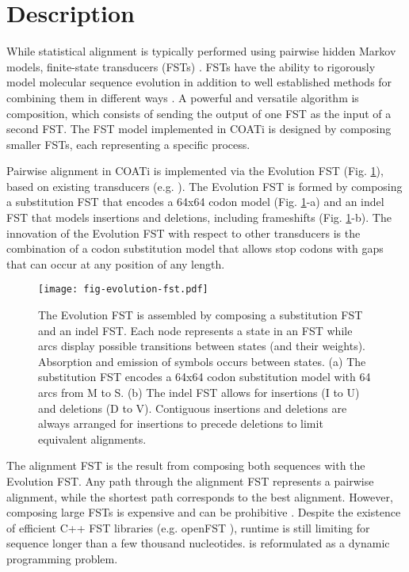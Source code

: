 \section{Description}

While statistical alignment is typically performed using pairwise hidden Markov
models, finite-state transducers (FSTs) .
FSTs  have the ability to rigorously model molecular sequence
evolution in addition to well established methods for combining them in
different ways \parencite{bradley2007transducers}.
A powerful and versatile algorithm is composition, which consists of sending the
output of one FST as the input of a second FST.
The FST model implemented in COATi is designed by composing smaller FSTs, each
representing a specific process.

Pairwise alignment in COATi is implemented via the Evolution FST (Fig.
\ref{fig:evolution-fst}), based on existing transducers (e.g.
\cite{holmes2001evolutionary}).
The Evolution FST is formed by composing a substitution FST that encodes a 64x64
codon model (Fig. \ref{fig:evolution-fst}-a) and an indel FST that models
insertions and deletions, including frameshifts (Fig. \ref{fig:evolution-fst}-b).
The innovation of the Evolution FST with respect to other transducers is the
combination of a codon substitution model that allows stop codons with gaps that
can occur at any position of any length.

\begin{figure}[h!]
\begin{framed}
\centering
    \texttt{[image: fig-evolution-fst.pdf]}
    \caption{The Evolution FST is assembled by composing a substitution FST and
    an indel FST. Each node represents a state in an FST while arcs display
    possible transitions between states (and their weights). Absorption and
    emission of symbols occurs between states. (a) The substitution FST
    encodes a 64x64 codon substitution model with 64 arcs from M to S. (b)
    The indel FST allows for insertions (I to U) and deletions (D to V).
    Contiguous insertions and deletions are always arranged for insertions to
    precede deletions to limit equivalent alignments.}
    \label{fig:evolution-fst}
\end{framed}
\end{figure}


The alignment FST is the result from composing both sequences with the Evolution
FST.
Any path through the alignment FST represents a pairwise alignment, while the
shortest path corresponds to the best alignment.
However, composing large FSTs is expensive and can be prohibitive .
Despite the existence of efficient C++ FST libraries (e.g. openFST
\cite{allauzen2007openfst}), runtime is still limiting for sequence longer than
a few thousand nucleotides.
 is
reformulated as a dynamic programming problem.
